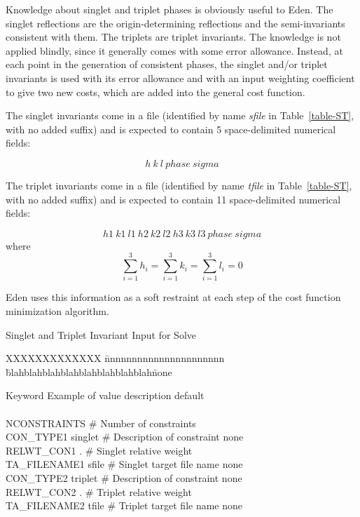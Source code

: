 \documentclass{report}
\begin{document}
{Knowledge about singlet and triplet phases is obviously useful to Eden.  
The singlet reflections are the origin-determining reflections and the
semi-invariants consistent with them.  The triplets are triplet invariants.
The knowledge is not applied blindly, since it
generally comes with some error allowance.  Instead, at each point in the
generation of consistent phases, the singlet and/or triplet invariants is
used with its error allowance and with an input weighting coefficient to
give two new costs, which are added into the general cost function.

The singlet invariants come in a file (identified by name {\it sfile}
in Table~\ref{table-ST}, with no added suffix) and is expected to contain
5 space-delimited numerical fields:

$$     h~k~l~phase~sigma $$

The triplet invariants come in a file (identified by name {\it tfile}
in Table~\ref{table-ST}, with no added suffix) and is expected to contain
11 space-delimited numerical fields:

$$     h1~k1~l1~h2~k2~l2~h3~k3~l3~phase~sigma $$
where
$$ \sum_{i=1}^{3}h_i = \sum_{i=1}^{3}k_i = \sum_{i=1}^{3}l_i = 0 $$

Eden uses this information as a soft restraint at each step of the cost
function minimization algorithm.

\begin{table} [htb]
\caption {\large Singlet and Triplet Invariant Input for Solve}
\label{table-ST}

\begin{tabbing}
XXXXXXXXXXXXX \= nnnnnnnnnnnnnnnnnnnnnn \= 
blahblahblahblahblahblahblahblah\= none \kill

Keyword \> Example of value \> description \> default \\
\\
NCONSTRAINTS  \> \# Number of constraints  \\
CON\_TYPE1 \> singlet \> \# Description of constraint \> none \\
RELWT\_CON1 . \> \# Singlet relative weight   \\
TA\_FILENAME1 \> sfile \> \# Singlet target file name \> none \\
CON\_TYPE2 \> triplet \> \# Description of constraint \> none \\
RELWT\_CON2 . \> \# Triplet relative weight   \\
TA\_FILENAME2 \> tfile \> \# Triplet target file name \> none \\
\end{tabbing} 
\end{table}

}
\end{document}
